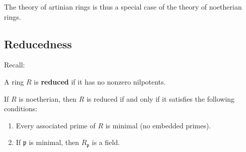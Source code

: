 The theory of artinian rings is thus a special case of the theory of noetherian
rings.

\subsection{Reducedness}

Recall:

\begin{definition} 
A ring $R$ is \textbf{reduced} if it has no nonzero nilpotents.
\end{definition} 

\begin{proposition} 
If $R$ is noetherian, then $R$ is reduced if and only if it satisfies the
following conditions:
\begin{enumerate}
\item Every associated prime of $R$ is  minimal (no embedded primes).
\item If $\mathfrak{p}$ is minimal, then $R_{\mathfrak{p}}$ is  a field.
\end{enumerate}
\end{proposition}
